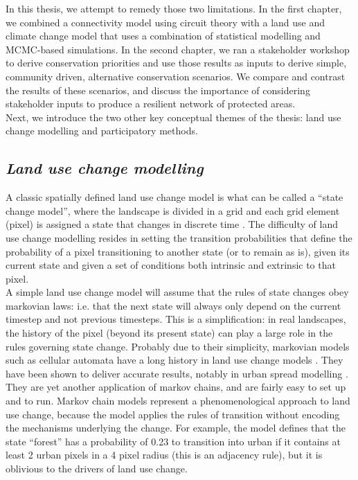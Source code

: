 \documentclass[12pt,Bold,TexShade]{thesis/mcgilletdclass}
\begin{document}
{In this thesis, we attempt to remedy those two limitations. In the first chapter, we combined a connectivity model using circuit theory with a land use and climate change model that uses a combination of statistical modelling and MCMC-based simulations. In the second chapter, we ran a stakeholder workshop to derive conservation priorities and use those results as inputs to derive simple, community driven, alternative conservation scenarios. We compare and contrast the results of these scenarios, and discuss the importance of considering stakeholder inputs to produce a resilient network of protected areas. \\

Next, we introduce the two other key conceptual themes of the thesis: land use change modelling and participatory methods. \\ \vspace{2em}

\subsection*{\textit{Land use change modelling \\ \vspace{1em}}}

A classic spatially defined land use change model is what can be called a “state change model”, where the landscape is divided in a grid and each grid element (pixel) is assigned a state that changes in discrete time \citep{daniel_state-and-transition_2016}. The difficulty of land use change modelling resides in setting the transition probabilities that define the probability of a pixel transitioning to another state (or to remain as is), given its current state and given a set of conditions both intrinsic and extrinsic to that pixel. \\

A simple land use change model will assume that the rules of state changes obey markovian laws: i.e. that the next state will always only depend on the current timestep and not previous timesteps. This is a simplification: in real landscapes, the history of the pixel (beyond its present state) can play a large role in the rules governing state change. Probably due to their simplicity, markovian models such as cellular automata have a long history in land use change models \citep{agarwal_review_2002}. They have been shown to deliver accurate results, notably in urban spread modelling \citep{soares-filho_dinamicastochastic_2002, jokar_arsanjani_integration_2013, iacono_markov_2015}. They are yet another application of markov chains, and are fairly easy to set up and to run. Markov chain models represent a phenomenological approach to land use change, because the model applies the rules of transition without encoding the mechanisms underlying the  change. For example, the model defines that the state “forest” has a probability of 0.23 to transition into urban if it contains at least 2 urban pixels in a 4 pixel radius (this is an adjacency rule), but it is oblivious to the drivers of land use change. \\

}
\end{document}
